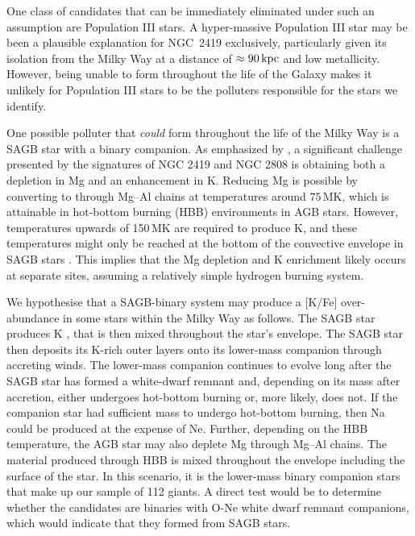 \documentclass[a4paper,fleqn,usenatbib]{mnras}
\begin{document}
One class of candidates that can be immediately eliminated under such an assumption are Population III stars. A hyper-massive Population III star may be been a plausible explanation for NGC~2419 \citep{carretta2013} exclusively, particularly given its isolation from the Milky Way at a distance of $\approx 90\,{\rm kpc}$ and low metallicity. However, being unable to form throughout the life of the Galaxy makes it unlikely for Population III stars to be the polluters responsible for the stars we identify.

One possible polluter that \textit{could} form throughout the life of the Milky Way is a SAGB star with a binary companion. As emphasized by \cite{prantzos2017}, a significant challenge presented by the signatures of NGC 2419 and NGC 2808 is obtaining both a depletion in Mg and an enhancement in K. Reducing Mg is possible by converting  to  through Mg--Al chains at temperatures around $75\,$MK, which is attainable in hot-bottom burning (HBB) environments in AGB stars. However, temperatures upwards of 150\,MK are required to produce K, and these temperatures might only be reached at the bottom of the convective envelope in SAGB stars \citep{iliadis2016}. This implies that the Mg depletion and K enrichment likely occurs at separate sites, assuming a relatively simple hydrogen burning system. 

We hypothesise that a SAGB-binary system may produce a [K/Fe] over-abundance in some stars within the Milky Way as follows. The SAGB star produces K \citep[destroying Na in the process;][]{prantzos2017}, that is then mixed throughout the star's envelope. The SAGB star then deposits its K-rich outer layers onto its lower-mass companion through accreting winds. The lower-mass companion continues to evolve long after the SAGB star has formed a white-dwarf remnant and, depending on its mass after accretion, either undergoes hot-bottom burning or, more likely, does not. If the companion star had sufficient mass to undergo hot-bottom burning, then Na could be produced \citep{prantzos2017} at the expense of Ne. Further, depending on the HBB temperature, the AGB star may also deplete Mg through Mg--Al chains. The material produced through HBB is mixed throughout the envelope including the surface of the star. In this scenario, it is the lower-mass binary companion stars that make up our sample of 112 giants. A direct test would be to determine whether the candidates are binaries with O-Ne white dwarf remnant companions, which would indicate that they formed from SAGB stars.
\end{document}
